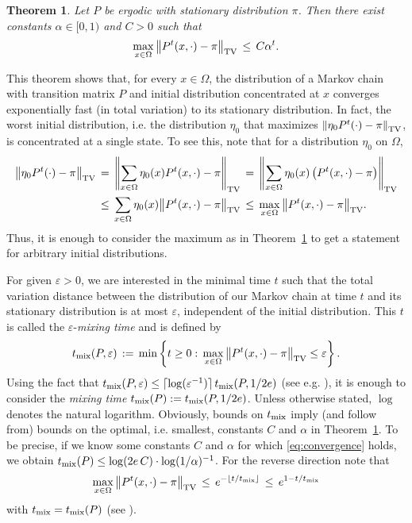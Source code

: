 \documentclass{dis}
\newtheorem{theorem}{Theorem}[chapter]
\theoremstyle{citing}
\begin{document}
\begin{theorem}\label{th:convergence}
Let $P$ be ergodic with stationary distribution $\pi$. 
Then there exist constants ${\alpha}\in[0,1)$ and $C>0$ such that
\begin{equation} \label{eq:convergence}
\max_{x\in{\Omega}} {\left\Vert {P^t(x,\cdot)-\pi} \right\Vert_{\rm TV}} \,\le\, C {\alpha}^t.
\end{equation}
\end{theorem}

This theorem shows that, for every $x\in{\Omega}$, the distribution of 
a Markov chain with transition matrix $P$ and initial distribution 
concentrated at $x$ converges exponentially fast (in total variation) 
to its stationary distribution.
In fact, 
the worst initial distribution, 
i.e. the distribution $\eta_0$ that maximizes 
${\left\Vert {\eta_0 P^t(\cdot)-\pi} \right\Vert_{\rm TV}}$, is concentrated at a single state. 
To see this, note that for a distribution $\eta_0$ on ${\Omega}$,
\[\begin{split}
{\left\Vert {\eta_0 P^t(\cdot)-\pi} \right\Vert_{\rm TV}} 
\,&=\, {\left\Vert {\sum_{x\in{\Omega}}\eta_0(x) P^t(x,\cdot)-\pi} \right\Vert_{\rm TV}}
\,=\, {\left\Vert {\sum_{x\in{\Omega}}\eta_0(x) \left(P^t(x,\cdot)-\pi\right)} \right\Vert_{\rm TV}}\\
&\le\,\sum_{x\in{\Omega}}\eta_0(x){\left\Vert {P^t(x,\cdot)-\pi} \right\Vert_{\rm TV}}
\,\le\,\max_{x\in{\Omega}}{\left\Vert {P^t(x,\cdot)-\pi} \right\Vert_{\rm TV}}.
\end{split}\]
Thus, it is enough to consider the maximum as in 
Theorem~\ref{th:convergence} to get a statement for arbitrary 
initial distributions.

For given ${\varepsilon}>0$, we are interested in the minimal time $t$ such 
that the total variation distance between the distribution of 
our Markov chain at time $t$ and its stationary distribution 
is at most ${\varepsilon}$, independent of the initial distribution. 
This $t$ is called the ${\varepsilon}$-\emph{mixing time} and is defined by 
\[
t_{\rm mix}(P,{\varepsilon}) \,:=\, \min\left\{t\ge0:\, 
	\max_{x\in{\Omega}} {\left\Vert {P^t(x,\cdot)-\pi} \right\Vert_{\rm TV}}\le{\varepsilon}\right\}.
\]
Using the fact that $t_{\rm mix}(P,{\varepsilon})\le
\lceil\log({\varepsilon}^{-1})\rceil\, t_{\rm mix}(P,1/2e)$ 
(see e.g. \cite[p. 55]{LPW}), it is enough to consider the 
\emph{mixing time} 
$t_{\rm mix}(P):=t_{\rm mix}(P,1/2e)$.
Unless otherwise stated, $\log$ denotes the natural logarithm.
Obviously, bounds on $t_{\rm mix}$ imply (and follow from) 
bounds on the optimal, i.e. smallest, constants $C$ and ${\alpha}$ 
in Theorem~\ref{th:convergence}. 
To be precise, if we know some constants $C$ and ${\alpha}$ for which 
\eqref{eq:convergence} holds, we obtain
$t_{\rm mix}(P) \le \log(2e\, C) \cdot\log(1/{\alpha})^{-1}$.
For the reverse direction note that 
\[
\max_{x\in{\Omega}} {\left\Vert {P^t(x,\cdot)-\pi} \right\Vert_{\rm TV}} 
\,\le\, e^{-\lfloor t/t_{\rm mix}\rfloor}
\,\le\, e^{1-t/t_{\rm mix}} 
\]
with $t_{\rm mix}=t_{\rm mix}(P)$ 
(see \cite[eq. (4.34)]{LPW}).
\end{document}
